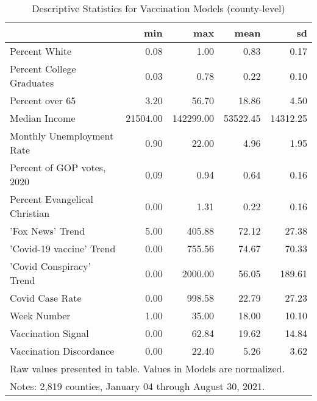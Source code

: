 \begin{table}[!h]

\caption{\label{tab:vacc-desc-table}Descriptive Statistics for Vaccination Models (county-level)}
\centering
\begin{tabular}[t]{lrrrr}
\toprule
  & min & max & mean & sd\\
\midrule
Percent White & \num{0.08} & \num{1.00} & \num{0.83} & \num{0.17}\\
Percent College Graduates & \num{0.03} & \num{0.78} & \num{0.22} & \num{0.10}\\
Percent over 65 & \num{3.20} & \num{56.70} & \num{18.86} & \num{4.50}\\
Median Income & \num{21504.00} & \num{142299.00} & \num{53522.45} & \num{14312.25}\\
Monthly Unemployment Rate & \num{0.90} & \num{22.00} & \num{4.96} & \num{1.95}\\
Percent of GOP votes, 2020 & \num{0.09} & \num{0.94} & \num{0.64} & \num{0.16}\\
Percent Evangelical Christian & \num{0.00} & \num{1.31} & \num{0.22} & \num{0.16}\\
'Fox News' Trend & \num{5.00} & \num{405.88} & \num{72.12} & \num{27.38}\\
'Covid-19 vaccine' Trend & \num{0.00} & \num{755.56} & \num{74.67} & \num{70.33}\\
'Covid Conspiracy' Trend & \num{0.00} & \num{2000.00} & \num{56.05} & \num{189.61}\\
Covid Case Rate & \num{0.00} & \num{998.58} & \num{22.79} & \num{27.23}\\
Week Number & \num{1.00} & \num{35.00} & \num{18.00} & \num{10.10}\\
Vaccination Signal & \num{0.00} & \num{62.84} & \num{19.62} & \num{14.84}\\
Vaccination Discordance & \num{0.00} & \num{22.40} & \num{5.26} & \num{3.62}\\
\bottomrule
\multicolumn{5}{l}{\rule{0pt}{1em}Raw values presented in table. Values in Models are normalized.}\\
\multicolumn{5}{l}{\rule{0pt}{1em}Notes: 2,819 counties, January 04 through August 30, 2021.}\\
\end{tabular}
\end{table}